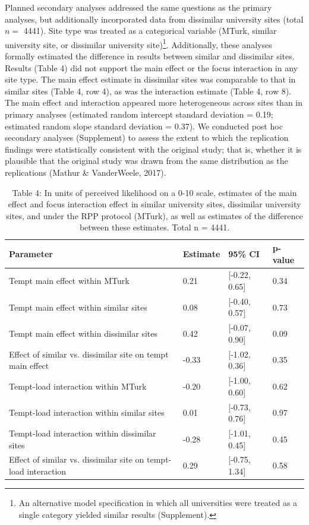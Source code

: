 \documentclass[english,floatsintext,man]{apa6}
\theoremstyle{definition}
\theoremstyle{definition}
\theoremstyle{definition}
\theoremstyle{remark}
\begin{document}
Planned secondary analyses addressed the same questions as the primary
analyses, but additionally incorporated data from dissimilar university
sites (total \(n=\) 4441). Site type was treated as a categorical
variable (MTurk, similar university site, or dissimilar university
site)\footnote{An alternative model specification in which all
  universities were treated as a single category yielded similar results
  (Supplement).}. Additionally, these analyses formally estimated the
difference in results between similar and dissimilar sites. Results
(Table 4) did not support the main effect or the focus interaction in
any site type. The main effect estimate in dissimilar sites was
comparable to that in similar sites (Table 4, row 4), as was the
interaction estimate (Table 4, row 8). The main effect and interaction
appeared more heterogeneous across sites than in primary analyses
(estimated random intercept standard deviation = 0.19; estimated random
slope standard deviation = 0.37). We conducted post hoc secondary
analyses (Supplement) to assess the extent to which the replication
findings were statistically consistent with the original study; that is,
whether it is plausible that the original study was drawn from the same
distribution as the replications (Mathur \& VanderWeele, 2017).

\begin{table}[tbp]
\begin{center}
\begin{threeparttable}
\caption{\label{tab:unnamed-chunk-3}Table 4: In units of perceived likelihood on a 0-10 scale, estimates of the main effect and focus interaction effect in similar university sites, dissimilar university sites, and under the RPP protocol (MTurk), as well as estimates of the difference between these estimates. Total n = 4441.}
\begin{tabular}{llll}
\toprule
Parameter & Estimate & 95\% CI & p-value\\
\midrule
Tempt main effect within MTurk & 0.21 & [-0.22, 0.65] & 0.34\\
Tempt main effect within similar sites & 0.08 & [-0.40, 0.57] & 0.73\\
Tempt main effect within dissimilar sites & 0.42 & [-0.07, 0.90] & 0.09\\
Effect of similar vs. dissimilar site on tempt main effect & -0.33 & [-1.02, 0.36] & 0.35\\
Tempt-load interaction within MTurk & -0.20 & [-1.00, 0.60] & 0.62\\
Tempt-load interaction within similar sites & 0.01 & [-0.73, 0.76] & 0.97\\
Tempt-load interaction within dissimilar sites & -0.28 & [-1.01, 0.45] & 0.45\\
Effect of similar vs. dissimilar site on tempt-load interaction & 0.29 & [-0.75, 1.34] & 0.58\\
\bottomrule
\end{tabular}
\end{threeparttable}
\end{center}
\end{table}
\end{document}
